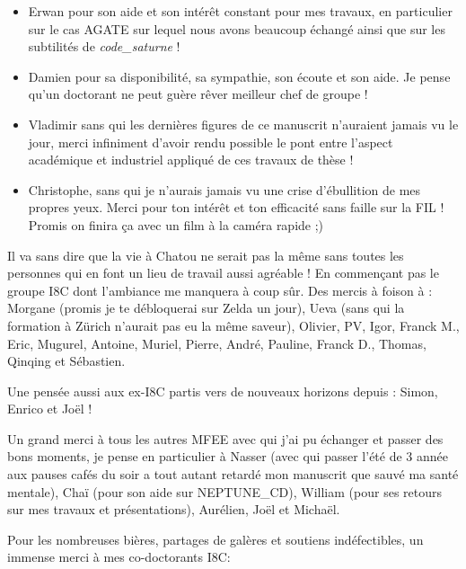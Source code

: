 \begin{itemize}

\item Erwan pour son aide et son intérêt constant pour mes travaux, en particulier sur le cas AGATE sur lequel nous avons beaucoup échangé ainsi que sur les subtilités de \textit{code\_saturne} !

\item Damien pour sa disponibilité, sa sympathie, son écoute et son aide. Je pense qu'un doctorant ne peut guère rêver meilleur chef de groupe !

\item Vladimir sans qui les dernières figures de ce manuscrit n'auraient jamais vu le jour, merci infiniment d'avoir rendu possible le pont entre l'aspect académique et industriel appliqué de ces travaux de thèse !

\item Christophe, sans qui je n'aurais jamais vu une crise d'ébullition de mes propres yeux. Merci pour ton intérêt et ton efficacité sans faille sur la FIL ! Promis on finira ça avec un film à la caméra rapide ;)

\end{itemize}

\npar

Il va sans dire que la vie à Chatou ne serait pas la même sans toutes les personnes qui en font un lieu de travail aussi agréable ! En commençant pas le groupe I8C dont l'ambiance me manquera à coup sûr. Des mercis à foison à : Morgane (promis je te débloquerai sur Zelda un jour), Ueva (sans qui la formation à Zürich n'aurait pas eu la même saveur), Olivier, PV, Igor, Franck M., Eric, Mugurel, Antoine, Muriel, Pierre, André, Pauline, Franck D., Thomas, Qinqing et Sébastien.

\npar

Une pensée aussi aux ex-I8C partis vers de nouveaux horizons depuis : Simon, Enrico et Joël !

\npar

Un grand merci à tous les autres MFEE avec qui j'ai pu échanger et passer des bons moments, je pense en particulier à Nasser (avec qui passer l'été de 3 année aux pauses cafés du soir a tout autant retardé mon manuscrit que sauvé ma santé mentale), Chaï (pour son aide sur NEPTUNE\_CD), William (pour ses retours sur mes travaux et présentations), Aurélien, Joël et Michaël.

\npar

Pour les nombreuses bières, partages de galères et soutiens indéfectibles, un immense merci à mes co-doctorants I8C:

